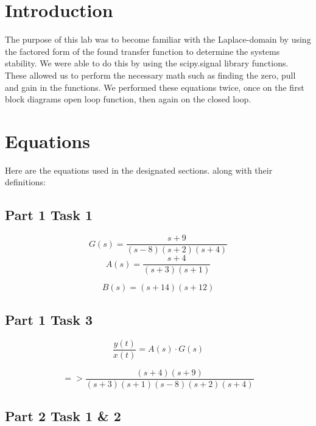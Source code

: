 \documentclass[12pt]{report}
\begin{document}
\section{Introduction}
 
The purpose of this lab was to become familiar with the Laplace-domain by using the factored form of the found transfer function to determine the systems stability. We were able to do this by using the scipy.signal library functions. These allowed us to perform the necessary math such as finding the zero, pull and gain in the functions. We performed these equations twice, once on the first block diagrams open loop function, then again on the closed loop.

\section{Equations}

Here are the equations used in the designated sections. along with their definitions: 

\subsection{Part 1 Task 1}

\begin{equation*}
G(s) = \frac{s + 9}{(s - 8)(s + 2)(s + 4)}
\end{equation*}
\begin{equation*}
A(s) = \frac {s + 4}{(s + 3)(s + 1)} 
\end{equation*}

\begin{equation*}
B(s) = (s + 14)(s + 12)
\end{equation*}

\subsection{Part 1 Task 3}

\begin{equation*}
\frac{y(t)}{x(t)} = A(s) \cdot G(s)
\end{equation*}

\begin{equation*}
=> \frac{(s+4)(s+9)}{(s+3)(s+1)(s-8)(s+2)(s+4)}
\end{equation*}

\subsection{Part 2 Task 1 & 2}
\end{document}
